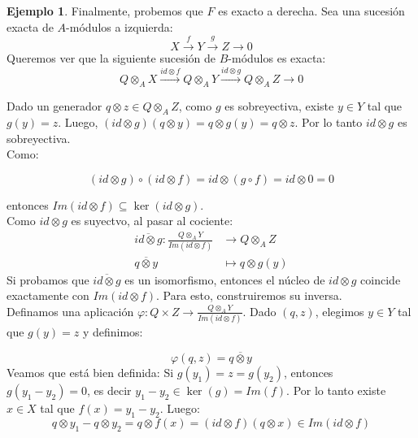 \documentclass{article}
\theoremstyle{plain}
\theoremstyle{definition}
\newtheorem{ejemplo}[theorem]{Ejemplo}
\theoremstyle{remark}
\begin{document}
\begin{ejemplo}
        Finalmente, probemos que $F$ es exacto a derecha. Sea una sucesión exacta de $A$-módulos a izquierda:
        \begin{equation*}
            X \xrightarrow{f} Y \xrightarrow{g} Z \longrightarrow 0
        \end{equation*}
        Queremos ver que la siguiente sucesión de $B$-módulos es exacta:
        \begin{equation*}
            Q \otimes_A X \xrightarrow{id \otimes f} Q \otimes_A Y \xrightarrow{id \otimes g} Q \otimes_A Z \longrightarrow 0
        \end{equation*}
        
        Dado un generador $q \otimes z \in Q \otimes_A Z$, como $g$ es sobreyectiva, existe $y \in Y$ tal que $g(y) = z$. Luego, $(id \otimes g)(q \otimes y) = q \otimes g(y) = q \otimes z$. Por lo tanto $id \otimes g$ es sobreyectiva. \\

        Como:

        \begin{equation*}
            (id \otimes g) \circ (id \otimes f) = id \otimes (g \circ f) = id \otimes 0 = 0
        \end{equation*}

        entonces $Im(id \otimes f) \subseteq \ker(id \otimes g)$. \\

        Como $id \otimes g$ es suyectvo, al pasar al cociente:
        \begin{align*}
            \overline{id \otimes g}: \frac{Q \otimes_A Y}{Im(id \otimes f)} &\longrightarrow Q \otimes_A Z \\
            \overline{q \otimes y} &\longmapsto q \otimes g(y)
        \end{align*}
        Si probamos que $\overline{id \otimes g}$ es un isomorfismo, entonces el núcleo de $id \otimes g$ coincide exactamente con $Im(id \otimes f)$. Para esto, construiremos su inversa.  \\

        Definamos una aplicación $\varphi: Q \times Z \to \frac{Q \otimes_A Y}{Im(id \otimes f)}$. Dado $(q,z)$, elegimos $y \in Y$ tal que $g(y)=z$ y definimos:

        \begin{equation*}
            \varphi(q,z) = \overline{q \otimes y}
        \end{equation*}
        Veamos que está bien definida: Si $g(y_1) = z = g(y_2)$, entonces $g(y_1 - y_2) = 0$, es decir $y_1 - y_2 \in \ker(g) = Im(f)$. Por lo tanto existe $x \in X$ tal que $f(x) = y_1 - y_2$. Luego:
        \begin{equation*}
            q \otimes y_1 - q \otimes y_2 = q \otimes f(x) = (id \otimes f)(q \otimes x) \in Im(id \otimes f)
        \end{equation*}


\end{ejemplo}
\end{document}

